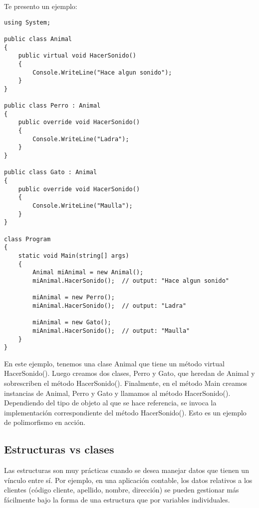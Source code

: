 \documentclass[executivepaper]{article}
\begin{document}
Te presento un ejemplo:
\begin{lstlisting}
using System;

public class Animal
{
    public virtual void HacerSonido()
    {
        Console.WriteLine("Hace algun sonido");
    }
}

public class Perro : Animal
{
    public override void HacerSonido()
    {
        Console.WriteLine("Ladra");
    }
}

public class Gato : Animal
{
    public override void HacerSonido()
    {
        Console.WriteLine("Maulla");
    }
}

class Program
{
    static void Main(string[] args)
    {
        Animal miAnimal = new Animal();
        miAnimal.HacerSonido();  // output: "Hace algun sonido"

        miAnimal = new Perro();
        miAnimal.HacerSonido();  // output: "Ladra"

        miAnimal = new Gato();
        miAnimal.HacerSonido();  // output: "Maulla"
    }
}
\end{lstlisting}

En este ejemplo, tenemos una clase Animal que tiene un método virtual HacerSonido(). Luego creamos dos clases, Perro y Gato, que heredan de Animal y sobrescriben el método HacerSonido(). Finalmente, en el método Main creamos instancias de Animal, Perro y Gato y llamamos al método HacerSonido(). Dependiendo del tipo de objeto al que se hace referencia, se invoca la implementación correspondiente del método HacerSonido(). Esto es un ejemplo de polimorfismo en acción.

\subsection*{Estructuras vs clases}

Las estructuras son muy prácticas cuando se desea manejar datos que tienen un vínculo entre sí. Por ejemplo, en una aplicación contable, los datos relativos a los clientes (código cliente, apellido, nombre, dirección) se pueden gestionar más fácilmente bajo la forma de una estructura que por variables individuales.
\end{document}
